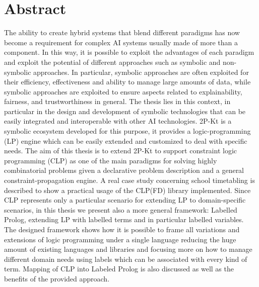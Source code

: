 
\cleardoublepage
{}
{}
\begingroup
\let\clearpage\relax
\let\cleardoublepage\relax
\let\cleardoublepage\relax

\chapter*{Abstract}

%
%
The ability to create hybrid systems that blend different paradigms has now become a requirement for complex AI systems usually made of more than a component. In this way, it is possible to exploit the advantages of each paradigm and exploit the potential of different approaches such as symbolic and non-symbolic approaches. In particular, symbolic approaches are often exploited for their efficiency, effectiveness and ability to manage large amounts of data, while symbolic approaches are exploited to ensure aspects related to explainability, fairness, and trustworthiness in general.\newline\newline
The thesis lies in this context, in particular in the design and development of symbolic technologies that can be easily integrated and interoperable with other AI technologies.
2P-Kt is a symbolic ecosystem developed for this purpose, it provides a logic-programming (LP) engine which can be easily extended and customized to deal with specific needs.\newline\newline
The aim of this thesis is to extend 2P-Kt to support constraint logic programming (CLP) as one of the main paradigms for solving highly combinatorial problems given a declarative problem description and a general constraint-propagation engine.
A real case study concerning school timetabling is described to show a practical usage of the CLP(FD) library implemented.\newline\newline
Since CLP represents only a particular scenario for extending LP to domain-specific scenarios, in this thesis we present also a more general framework: Labelled Prolog, extending LP with labelled terms and in particular labelled variables.
The designed framework shows how it is possible to frame all variations and extensions of logic programming under a single language reducing the huge amount of existing languages and libraries and focusing more on how to manage different domain needs using labels which can be associated with every kind of term.\newline\newline
Mapping of CLP into Labeled Prolog is also discussed as well as the benefits of the provided approach.

\endgroup

\vfill


